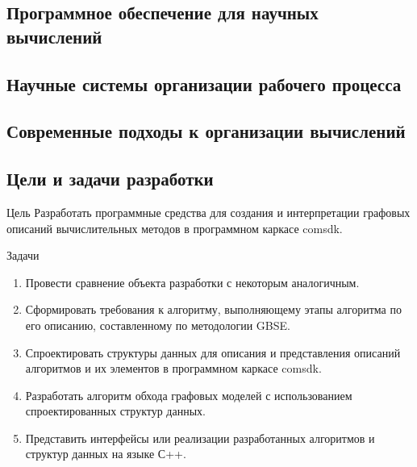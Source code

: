 ﻿%
\subsection{Программное обеспечение для научных вычислений}
\begin{frame}


\end{frame}
\subsection{Научные системы организации рабочего процесса}
\begin{frame}



\end{frame}
\subsection{Современные подходы к организации вычислений}
\begin{frame}


\end{frame}
\subsection{Цели и задачи разработки}
\begin{frame}

    \begin{block}{Цель}
        Разработать программные средства для создания и интерпретации графовых описаний вычислительных методов в программном каркасе comsdk.
    \end{block}

    \begin{block}{Задачи}
        \begin{enumerate}
            \item Провести сравнение объекта разработки с некоторым аналогичным.
            \item Сформировать требования к алгоритму, выполняющему этапы алгоритма по его описанию, составленному по методологии GBSE.
            \item Спроектировать структуры данных для описания и представления описаний алгоритмов и их элементов в программном каркасе comsdk.
            \item Разработать алгоритм обхода графовых моделей с использованием спроектированных структур данных.
            \item Представить интерфейсы или реализации разработанных алгоритмов и структур данных на языке С++.
        \end{enumerate}
    \end{block}

\end{frame}


